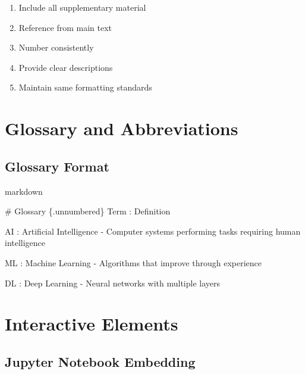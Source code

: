\documentclass[
  11pt,
  letterpaper,
]{book}
\newenvironment{Shaded}{\begin{snugshade}}{\end{snugshade}}
\newcommand{\FunctionTok}[1]{\textcolor[rgb]{0.28,0.35,0.67}{#1}}
\newcommand{\NormalTok}[1]{\textcolor[rgb]{0.00,0.23,0.31}{#1}}
\providecommand{\tightlist}{%
  \setlength{\itemsep}{0pt}\setlength{\parskip}{0pt}}
\begin{document}
\begin{enumerate}
\def\labelenumi{\arabic{enumi}.}
\tightlist
\item
  Include all supplementary material
\item
  Reference from main text
\item
  Number consistently
\item
  Provide clear descriptions
\item
  Maintain same formatting standards
\end{enumerate}

\section*{Glossary and Abbreviations}\label{glossary-and-abbreviations}


\subsection*{Glossary Format}\label{glossary-format}

markdown

\begin{Shaded}
\begin{Highlighting}[]
\FunctionTok{\# Glossary \{.unnumbered\}}
\NormalTok{Term}
\NormalTok{: Definition}


\NormalTok{AI}
\NormalTok{: Artificial Intelligence {-} Computer systems performing tasks requiring human intelligence}

\NormalTok{ML}
\NormalTok{: Machine Learning {-} Algorithms that improve through experience}

\NormalTok{DL}
\NormalTok{: Deep Learning {-} Neural networks with multiple layers}
\end{Highlighting}
\end{Shaded}

\section*{Interactive Elements}\label{interactive-elements}


\subsection*{Jupyter Notebook
Embedding}\label{jupyter-notebook-embedding}
\end{document}
